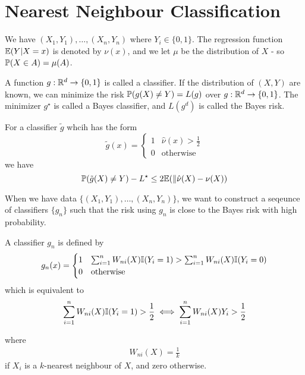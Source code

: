 
\chapter{Nearest Neighbour Classification}
\label{cha:near-neighb-class}

We have $(X_{1}, Y_{1}), \dots, (X_{n}, Y_{n})$ where $Y_{i} \in \{ 0,
1 \}$.  The regression function $\E{Y | X = x}$ is denoted by
$\nu(x)$, and we let $\mu$ be the distribution of $X$ - so $\Prob{X
  \in A} = \mu(A)$.

A function $g: \mathbb{R}^{d} \rightarrow \{ 0, 1 \}$ is called a classifier.
If the distribution of $(X, Y)$ are known, we can minimize the risk
$\Prob{g(X) \neq Y} = L(g)$ over $g: \mathbb{R}^{d} \rightarrow \{ 0, 1 \}$.
The minimizer $g^{\star}$ is called a Bayes classifier, and $L(g^{d})$
is called the Bayes risk.

\begin{lem}
  For a classifier $\tilde g$ whcih has the form
  \begin{equation}
    \label{eq:90}
    \tilde g(x) =
    \begin{cases}
      1 & \hat \nu(x) > \frac{1}{2} \\
      0 & \text{otherwise}
    \end{cases}
  \end{equation} we have
  \begin{equation}
    \label{eq:93}
    \Prob{\tilde g(X) \neq Y} - L^{\star} \leq 2 \E{\| \hat \nu(X) - \nu(X)}
  \end{equation}
\end{lem}

When we have data $\{ (X_{1}, Y_{1}), \dots, (X_{n}, Y_{n}) \}$, we
want to construct a seqeunce of classifiers $\{ g_{n} \}$ such that
the risk using $g_{n}$ is close to the Bayes risk with high
probability.

\begin{defn}
  \label{defn:nearest_neighbour_classification:1}
  A \knn classifier $g_{n}$ is defined by
  \begin{align}
    \label{eq:94}
    g_{n}(x) =
    \begin{cases}
      1 & \sum_{i=1}^{n} W_{ni}(X) \I{Y_{i} = 1} > \sum_{i=1}^{n}
      W_{ni}(X) \I{Y_{i} = 0} \\
      0 & \text{otherwise}
    \end{cases}
  \end{align}
  which is equivalent to
  \begin{align}
    \label{eq:96}
    \sum_{i=1}^{n} W_{ni}(X) \I{Y_{i} = 1} > \frac{1}{2} \iff
    \sum_{i=1}^{n} W_{ni}(X) Y_{i} > \frac{1}{2}
  \end{align}
  
  where
  \begin{align}
    \label{eq:95}
    W_{ni}(X) = \frac{1}{k} 
  \end{align} if $X_{i}$ is a $k$-nearest neighbour of $X$, and zero otherwise.
\end{defn}

